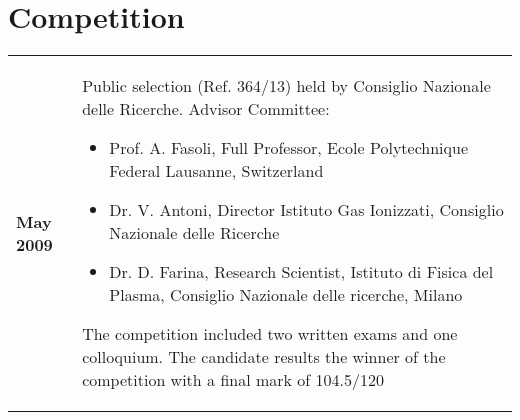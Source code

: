 \section{Competition}
\begin{tabular}{>{\bfseries}l p{15cm}}
May 2009 & Public selection (Ref. 364/13) held by Consiglio
  Nazionale delle Ricerche. Advisor Committee:
  \begin{itemize}
  \item Prof. A. Fasoli, Full Professor, Ecole Polytechnique Federal Lausanne, Switzerland
  \item Dr. V. Antoni, Director Istituto Gas Ionizzati, Consiglio Nazionale delle Ricerche
  \item Dr. D. Farina, Research Scientist, Istituto di Fisica del
    Plasma, Consiglio Nazionale delle ricerche, Milano
  \end{itemize}
  The competition included two written exams
  and one colloquium. The candidate results the winner of the
  competition with a final mark of 104.5/120 
\end{itemize} 
\end{tabular}
